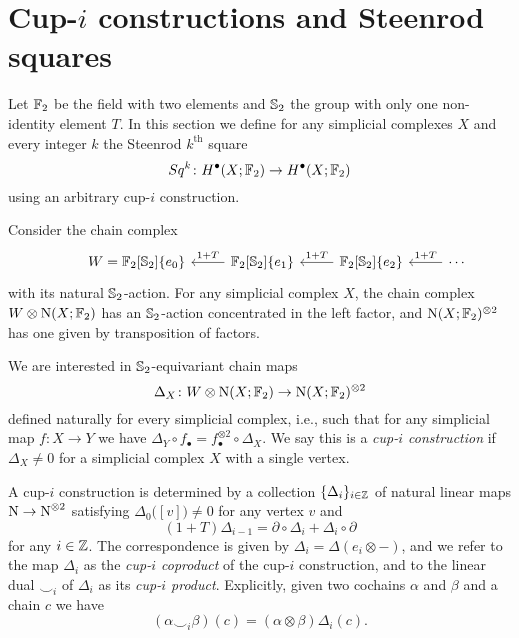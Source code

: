 
\section{Cup-\texorpdfstring{$i$}{i} constructions and Steenrod squares} \label{s:squares}

Let $\Ftwo$ be the field with two elements and $\S_2$ the group with only one non-identity element $T$.
In this section we define for any simplicial complexes $X$ and every integer $k$ the Steenrod $k^{\mathrm{th}}$ square
\begin{equation*}
Sq^k \colon H^\bullet(X; \Ftwo) \to H^{\bullet}(X; \Ftwo)
\end{equation*}
using an arbitrary cup-$i$ construction.

Consider the chain complex
\begin{equation*}
\begin{tikzcd}[column sep=normal]
& W =  \Ftwo[\S_2]\{e_0\} & \arrow[l, "1+T"'] \Ftwo[\S_2]\{e_1\} & \arrow[l, "1+T"']
\Ftwo[\S_2]\{e_2\} & \arrow[l, "1+T"'] \cdots
\end{tikzcd}
\end{equation*}
with its natural $\S_2$-action.
For any simplicial complex $X$, the chain complex $W \otimes \chains(X; \Ftwo)$ has an $\S_2$-action concentrated in the left factor, and $\chains(X; \Ftwo)^{\otimes 2}$ has one given by transposition of factors.

We are interested in $\S_2$-equivariant chain maps
\begin{equation} \label{e:steenrod diagonal}
\Delta_X \colon W \otimes \chains(X; \Ftwo) \to \chains(X; \Ftwo)^{\otimes 2}
\end{equation}
defined naturally for every simplicial complex, i.e., such that for any simplicial map $f \colon X \to Y$ we have $\Delta_Y \circ f_\bullet = f_\bullet^{\otimes 2} \circ \Delta_X$.
We say this is a \textit{cup-$i$ construction} if $\Delta_X \neq 0$ for a simplicial complex $X$ with a single vertex.

A cup-$i$ construction is determined by a collection $\{\Delta_i\}_{i \in \Z}$ of natural linear maps $\chains \to \chains^{\otimes 2}$ satisfying $\Delta_0 \big([v]\big) \neq 0$ for any vertex $v$ and
\begin{equation} \label{e:boundary of cup-i}
(1 + T) \Delta_{i-1} = \partial \circ \Delta_i + \Delta_i \circ \partial
\end{equation}
for any $i \in \Z$.
The correspondence is given by $\Delta_i = \Delta(e_i \otimes -)$, and we refer to the map $\Delta_i$ as the \textit{cup-$i$ coproduct} of the cup-$i$ construction, and to the linear dual $\smallsmile_i$ of $\Delta_i$ as its \textit{cup-$i$ product}.
Explicitly, given two cochains $\alpha$ and $\beta$ and a chain $c$ we have
\begin{equation*}
(\alpha \smallsmile_i \beta)(c) = (\alpha \otimes \beta) \Delta_i(c).
\end{equation*}

